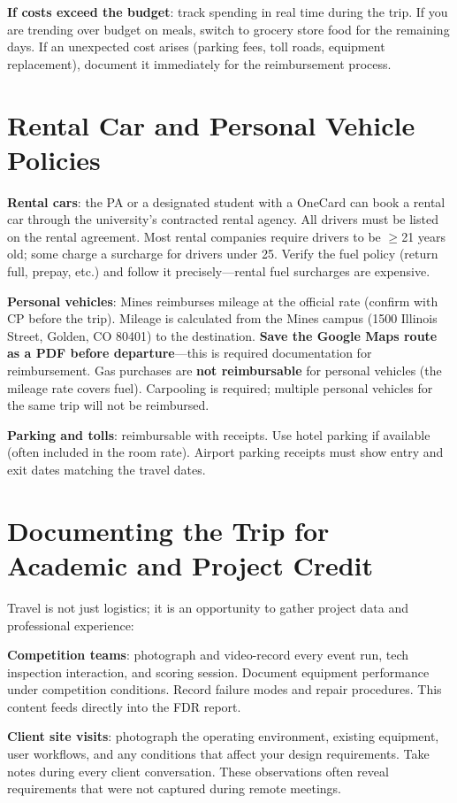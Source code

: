 \textbf{If costs exceed the budget}: track spending in real time during the trip. If you are trending over budget on meals, switch to grocery store food for the remaining days. If an unexpected cost arises (parking fees, toll roads, equipment replacement), document it immediately for the reimbursement process.



\section{Rental Car and Personal Vehicle Policies}
\textbf{Rental cars}: the PA or a designated student with a OneCard can book a rental car through the university's contracted rental agency. All drivers must be listed on the rental agreement. Most rental companies require drivers to be $\geq$21 years old; some charge a surcharge for drivers under 25. Verify the fuel policy (return full, prepay, etc.) and follow it precisely---rental fuel surcharges are expensive.

\textbf{Personal vehicles}: Mines reimburses mileage at the official rate (confirm with CP before the trip). Mileage is calculated from the Mines campus (1500 Illinois Street, Golden, CO 80401) to the destination. \textbf{Save the Google Maps route as a PDF before departure}---this is required documentation for reimbursement. Gas purchases are \textbf{not reimbursable} for personal vehicles (the mileage rate covers fuel). Carpooling is required; multiple personal vehicles for the same trip will not be reimbursed.

\textbf{Parking and tolls}: reimbursable with receipts. Use hotel parking if available (often included in the room rate). Airport parking receipts must show entry and exit dates matching the travel dates.

\section{Documenting the Trip for Academic and Project Credit}
Travel is not just logistics; it is an opportunity to gather project data and professional experience:

\textbf{Competition teams}: photograph and video-record every event run, tech inspection interaction, and scoring session. Document equipment performance under competition conditions. Record failure modes and repair procedures. This content feeds directly into the FDR report.

\textbf{Client site visits}: photograph the operating environment, existing equipment, user workflows, and any conditions that affect your design requirements. Take notes during every client conversation. These observations often reveal requirements that were not captured during remote meetings.

